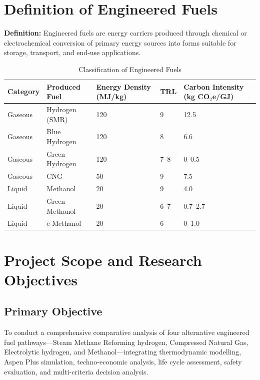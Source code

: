 \documentclass[12pt,twoside,openany]{book}
\begin{document}
\section{Definition of Engineered Fuels}

\textbf{Definition:} Engineered fuels are energy carriers produced through chemical or electrochemical conversion of primary energy sources into forms suitable for storage, transport, and end-use applications.

\begin{table}[htbp]
    \centering
    \caption{Classification of Engineered Fuels}
    \label{tab:classification}
    \begin{tabular}{L{2.5cm} L{3cm} C{2cm} C{1cm} C{2.5cm}}
    \hline
    \textbf{Category} & \textbf{Produced Fuel} & \textbf{Energy Density (MJ/kg)}
                      & \textbf{TRL} & \textbf{Carbon Intensity (kg CO$_2$e/GJ)} \\
    \hline
    Gaseous & Hydrogen (SMR)   & 120 & 9   & 12.5     \\
    Gaseous & Blue Hydrogen    & 120 & 8   & 6.6      \\
    Gaseous & Green Hydrogen   & 120 & 7--8 & 0--0.5  \\
    Gaseous & CNG              & 50  & 9   & 7.5      \\
    Liquid  & Methanol         & 20  & 9   & 4.0      \\
    Liquid  & Green Methanol   & 20  & 6--7 & 0.7--2.7 \\
    Liquid  & e-Methanol       & 20  & 6   & 0--1.0   \\
    \hline
    \end{tabular}
\end{table}

\section{Project Scope and Research Objectives}

\subsection{Primary Objective}

To conduct a comprehensive comparative analysis of four alternative engineered fuel pathways---Steam Methane Reforming hydrogen, Compressed Natural Gas, Electrolytic hydrogen, and Methanol---integrating thermodynamic modelling, Aspen Plus simulation, techno-economic analysis, life cycle assessment, safety evaluation, and multi-criteria decision analysis.
\end{document}

